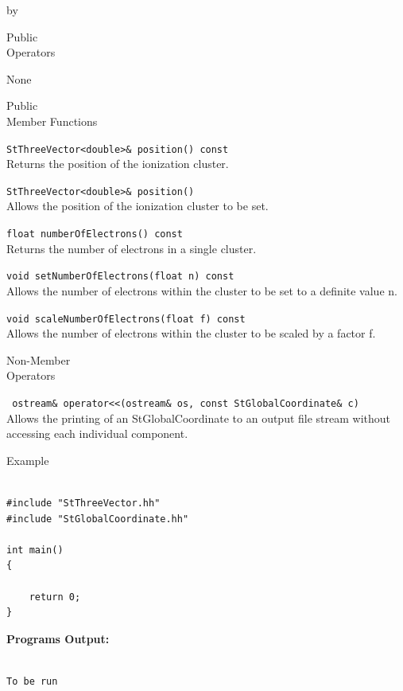 \documentclass[twoside]{article}
\newcommand{\entrylabel}[1]{\mbox{\textbf{{#1}}}\hfil}%
\newenvironment{entry}
{\begin{list}{}%
    {\renewcommand{\makelabel}{\entrylabel}%
     \setlength{\labelwidth}{90pt}%
     \setlength{\leftmargin}{\labelwidth}
     \advance\leftmargin by \labelsep%
      }%
    }%
  {\end{list}}
\newcommand{\Entrylabel}[1]%
{\raisebox{0pt}[1ex][0pt]{\makebox[\labelwidth][l]%
    {\parbox[t]{\labelwidth}{\hspace{0pt}\textbf{{#1}}}}}}
\newenvironment{Entry}%
{\renewcommand{\entrylabel}{\Entrylabel}\begin{entry}}%
  {\end{entry}}
\begin{document}
\begin{Entry}
\item[Public \\ Operators]

  None

\item[Public \\ Member Functions]

  \verb+StThreeVector<double>& position() const+\\
  Returns the position of the ionization cluster.

  \verb+StThreeVector<double>& position()+\\
  Allows the position of the ionization cluster to be set.

  \verb+float numberOfElectrons() const+\\
  Returns the number of electrons in a single cluster.

  \verb+void setNumberOfElectrons(float n) const+\\
  Allows the number of electrons within the cluster to be set
  to a definite value n.

  \verb+void scaleNumberOfElectrons(float f) const+\\
  Allows the number of electrons within the cluster to be scaled
  by a factor f.

\item[Non-Member \\ Operators]

  \verb+ ostream& operator<<(ostream& os, const StGlobalCoordinate& c)+\\
  Allows the printing of an StGlobalCoordinate to an output file stream
  without accessing each individual component.

\item[Example]

{\footnotesize
\begin{verbatim}

#include "StThreeVector.hh"
#include "StGlobalCoordinate.hh"

int main()
{

    return 0;
}
\end{verbatim}
}%
{\bf Programs Output:}
{\footnotesize
\begin{verbatim}

To be run

\end{verbatim}
} %

\end{Entry}
\clearpage
\end{document}
